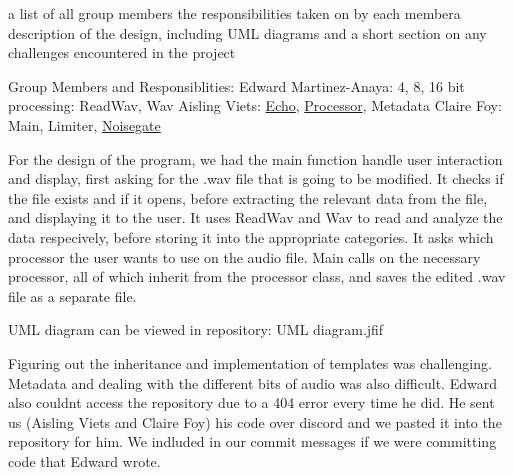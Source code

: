 a list of all group members the responsibilities taken on by each membera description of the design, including U\+ML diagrams and a short section on any challenges encountered in the project

Group Members and Responsiblities\+: Edward Martinez-\/\+Anaya\+: 4, 8, 16 bit processing\+: Read\+Wav, Wav Aisling Viets\+: \hyperlink{classEcho}{Echo}, \hyperlink{classProcessor}{Processor}, Metadata Claire Foy\+: Main, Limiter, \hyperlink{classNoisegate}{Noisegate}

For the design of the program, we had the main function handle user interaction and display, first asking for the .wav file that is going to be modified. It checks if the file exists and if it opens, before extracting the relevant data from the file, and displaying it to the user. It uses Read\+Wav and Wav to read and analyze the data respecively, before storing it into the appropriate categories. It asks which processor the user wants to use on the audio file. Main calls on the necessary processor, all of which inherit from the processor class, and saves the edited .wav file as a separate file.

U\+ML diagram can be viewed in repository\+: U\+ML diagram.\+jfif

Figuring out the inheritance and implementation of templates was challenging. Metadata and dealing with the different bits of audio was also difficult. Edward also couldn\textquotesingle{}t access the repository due to a 404 error every time he did. He sent us (Aisling Viets and Claire Foy) his code over discord and we pasted it into the repository for him. We indluded in our commit messages if we were committing code that Edward wrote. 